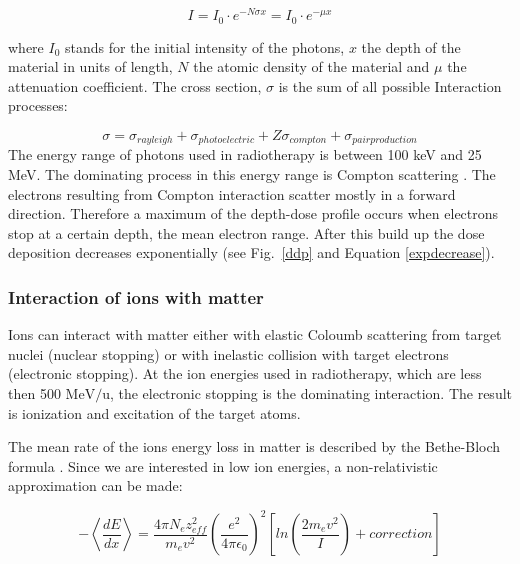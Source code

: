 \documentclass[type=dr, dr=rernat, accentcolor=tud7b,colorbacktitle, bigchapter, openright, twoside, 12pt ]{tudthesis}
\begin{document}
\begin{equation}
 I = I_{0} \cdot e^{- N \sigma x} = I_{0} \cdot e^{-\mu x}
 \label{expdecrease}
\end{equation} 

where $I_{0}$ stands for the initial intensity of the photons, $x$ the depth of the material in units of length, $N$ the atomic density of the material and $\mu$ the attenuation coefficient. The cross section, $\sigma$ is the sum of all possible Interaction processes:

\begin{equation}
{\sigma} = \sigma_{rayleigh} + \sigma_{photoelectric} + Z\sigma_{compton} + \sigma_{pairproduction} 
\end{equation}
The energy range of photons used in radiotherapy is between 100 keV and 25 MeV. The dominating process in this energy range is Compton scattering \cite{Alpen1998}.
The electrons resulting from Compton interaction scatter mostly in a forward direction. Therefore a maximum of the depth-dose profile occurs when electrons stop at a certain depth, 
the mean electron range. After this build up the dose deposition decreases exponentially (see Fig.~\ref{ddp} and Equation \ref{expdecrease}).

\subsubsection{Interaction of ions with matter}
\label{iion}
Ions can interact with matter either with elastic Coloumb scattering from target nuclei (nuclear stopping) or with inelastic collision with target electrons (electronic stopping).
At the ion energies used in radiotherapy, which are less then 500 $\mathrm{MeV}/\mathrm{u}$, the electronic stopping is the dominating interaction. The result is ionization and excitation of the target atoms.

The mean rate of the ions energy loss in matter is described by the Bethe-Bloch formula \cite{Bethe1930, Bloch1933}. Since we are interested in low ion energies, a non-relativistic approximation can be made:

\begin{equation}
- \left \langle \frac{dE}{dx} \right \rangle = \frac{ 4 \pi N_{e} z_{eff}^{2} }{ m_{e} v^{2} } \left( \frac{e^{2}}{4\pi \epsilon_{0}} \right) ^{2} \left[ln \left( \frac{2m_{e}v^{2}}{I} \right)+correction \right]
 \label{bethe}
\end{equation}
\end{document}
